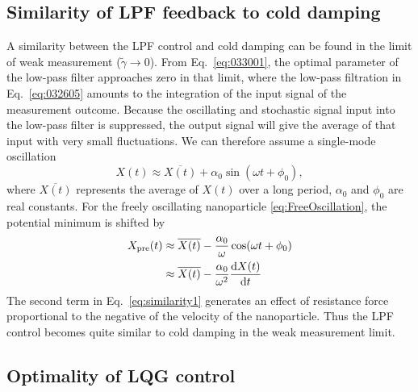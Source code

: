 \documentclass[aps,pra,superscriptaddress,twocolumn
]{revtex4-2}
\renewcommand{\d}{{\rm d}}
\newcommand{\majrev}[1]{{#1}}
\begin{document}
\majrev{\subsection{Similarity of LPF feedback to cold damping}}

 {A similarity between the LPF control and cold damping can be found 
 in the limit of weak measurement ($\tilde \gamma \to 0$).
 From Eq.~\eqref{eq:033001}, the optimal parameter of the low-pass filter 
 approaches zero in that limit, 
 where the low-pass filtration in Eq.~\eqref{eq:032605} 
 amounts to the integration of the input signal of the measurement outcome.
 Because the oscillating and stochastic signal input into the low-pass filter 
 is suppressed, 
 the output signal will give the average of that input 
 with very small fluctuations.
 We can therefore assume a single-mode oscillation 
 \begin{equation}
  X(t) \approx \overline{X(t)} + \alpha_0 \sin (\omega t + \phi_0),
  \label{eq:FreeOscillation}
 \end{equation}
 where $\overline{X (t)}$ represents the average of $X(t)$ over a long period, 
 $\alpha_0$ and $\phi_0$ are real constants.
 For the freely oscillating nanoparticle \eqref{eq:FreeOscillation}, 
 the potential minimum is shifted by
 \begin{alignat}{1}
  X_{\rm pre} (t) &\approx \overline{X(t)} - 
  \frac{\alpha_0}{\omega} \cos (\omega t + \phi_0) \notag \\
  &\approx \overline{X(t)} - \frac{\alpha_0}{\omega^2} \frac{\d X(t)}{\d t}
  \label{eq:similarity1}
 \end{alignat} 
 The second term in Eq.~\eqref{eq:similarity1} generates 
 an effect of resistance force proportional to the negative of the velocity 
 of the nanoparticle. 
 Thus the LPF control becomes quite similar to cold damping 
 in the weak measurement limit.
 }





 \majrev{\subsection{Optimality of LQG control}}
 
\end{document}
